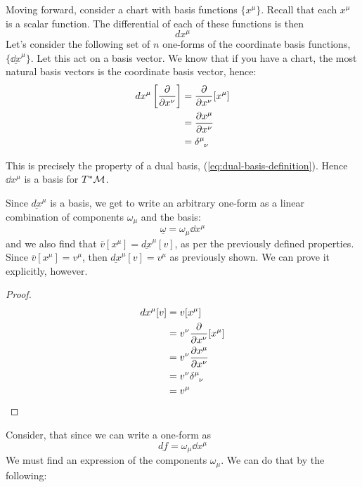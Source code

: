 		Moving forward, consider a chart with basis functions $\{x^\mu\}$. Recall that each $x^\mu$ is a
		scalar function. The differential of each of these functions is then
		\[
			dx^\mu
		\]
		Let's consider the following set of $n$ one-forms of the coordinate basis functions, 
		$\{\underline{\dd{x}}^\mu\}$.
		Let this act on a basis vector. We know that if you have a chart, the most natural
		basis vectors is the coordinate basis vector, hence:
		\begin{align*}
			\dd{x^\mu}\qty[
				\pdv{}{x^\nu}  
				] 
			&= \pdv{}{x^\nu}[x^\mu]\\
			&= \pdv{x^\mu}{x^\nu}\\
			&= \tensor{\delta}{^\mu_\nu}
		\end{align*}

		This is precisely the property of a dual basis, (\ref{eq:dual-basis-definition}). Hence
		$\dd{x^\mu}$ is a basis for $T^* \mathcal M$. 

		Since $\underline{dx}^\mu$ is a basis, we get to write an arbitrary one-form as a linear 
		combination of components $\omega_\mu$ and the basis:
		\[
			\underline\omega = \omega_\mu \dd{x^\mu}
		\]
		and we also find that $\overline{v}[x^\mu]= \underline{dx}^\mu [v]$, as per the previously 
		defined properties. Since $\overline{v}[x^\mu] = v^\mu$, then $\underline{dx}^\mu [v] = v^\mu$ as previously shown. We can prove
		it explicitly, however.
		\begin{proof}
			\begin{align*}
				dx^\mu[v] 
				&= v[x^\mu]\\
				&= v^\nu \pdv{}{x^\nu} [x^\mu] \\
				&= v^\nu \pdv{x^\mu}{x^\nu}\\
				&= v^\nu \tensor{\delta}{^\mu_\nu}\\
				&= v^\mu
			\end{align*}
		\end{proof}

		Consider, that since we can write a one-form as 
		\[
			\underline{df} = \omega_\mu\dd{x^\mu}
		\]
		We must find an expression of the components $\omega_\mu$. We can do that
		by the following:

